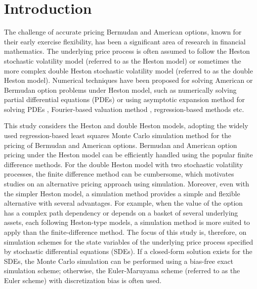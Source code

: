 \documentclass[]{interact}
\theoremstyle{plain}%
\theoremstyle{definition}
\theoremstyle{remark}
\begin{document}
\section{Introduction}

The challenge of accurate pricing Bermudan and American options, known for their early exercise flexibility, has been a significant area of research in financial mathematics. The underlying price process is often assumed to follow the Heston stochastic volatility model \cite{heston93} (referred to as the Heston model) or sometimes the more complex double Heston stochastic volatility model \cite{christoffersen2009shape} (referred to as the double Heston model). Numerical techniques have been proposed for solving American or Bermudan option problems under Heston model, such as numerically solving partial differential equations (PDEs) \cite{haentjens2015adi, cai2020finite, zvan1998penalty, ikonen2009operator} or using asymptotic expansion method for solving PDEs \cite{zhang2020asymptotic}, Fourier-based valuation method \cite{fang2011fourier}, regression-based methods \cite{longstaff2001valuing} etc.

This study considers the Heston and double Heston models, adopting the widely used regression-based least squares Monte Carlo simulation method for the pricing of Bermudan and American options\cite{longstaff2001valuing}. Bermudan and American option pricing under the Heston model can be efficiently handled using the popular finite difference methods. For the double Heston model with two stochastic volatility processes, the finite difference method can be cumbersome, which motivates studies on an alternative pricing approach using simulation. Moreover, even with the simpler Heston model, a simulation method provides a simple and flexible alternative with several advantages. For example, when the value of the option has a complex path dependency or depends on a basket of several underlying assets, each following Heston-type models, a simulation method is more suited to apply than the finite-difference method.  The focus of this study is, therefore, on simulation schemes for the state variables of the underlying price process specified by stochastic differential equations (SDEs). If a closed-form solution exists for the SDEs, the Monte Carlo simulation can be performed using a bias-free exact simulation scheme; otherwise, the Euler-Maruyama scheme (referred to as the Euler scheme) with discretization bias is often used.
\end{document}
